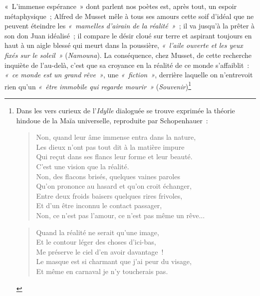\documentclass[french,twoside]{book} %
\def\mednobreak{\ifdim\lastskip<\medskipamount
  \removelastskip\nopagebreak\medskip\fi}
\newcommand{\labelblock}[1]{\medbreak{\noindent\color{rubric}\bfseries #1}\par\mednobreak}
\begin{document}
« L’immense espérance » dont parlent nos poètes est, après tout, un espoir métaphysique ; Alfred de Musset mêle à tous ses amours cette soif d’idéal que ne peuvent éteindre les \emph{« mamelles d’airain de la réalité »} ; il va jusqu’à la prêter à son don  Juan idéalisé ; il compare le désir cloué sur terre et aspirant toujours en haut à un aigle blessé qui meurt dans la poussière, \emph{« l’aile ouverte et les yeux fixés sur le soleil »} (\emph{Namouna}). La conséquence, chez Musset, de cette recherche inquiète de l’au-delà, c’est que sa croyance en la réalité de ce monde s’affaiblit : \emph{« ce monde est un grand rêve »}, une \emph{« fiction »}, derrière laquelle on n’entrevoit rien qu’un \emph{« être immobile qui regarde mourir »} (\emph{Souvenir})\footnote{\noindent Dans les vers curieux de l’\emph{Idylle} dialoguée se trouve exprimée la théorie hindoue de la Maïa universelle, reproduite par Schopenhauer :\par

\labelblock{Albert.}


\begin{verse}
Non, quand leur âme immense entra dans la nature,\\
Les dieux n’ont pas tout dit à la matière impure\\
Qui reçut dans ses flancs leur forme et leur beauté.\\
C’est une vision que la réalité.\\
Non, des flacons brisés, quelques vaines paroles\\
Qu’on prononce au hasard et qu’on croit échanger,\\
Entre deux froids baisers quelques rires frivoles,\\
Et d’un être inconnu le contact passager,\\
Non, ce n’est pas l’amour, ce n’est pas même un rêve...\\
\end{verse}
\par

\labelblock{Rodolphe.}


\begin{verse}
Quand la réalité ne serait qu’une image,\\
Et le contour léger des choses d’ici-bas,\\
Me préserve le ciel d’en avoir davantage !\\
Le masque est si charmant que j’ai peur du visage,\\
Et même en carnaval je n’y toucherais pas.\\
\end{verse}
\par

}
\end{document}
